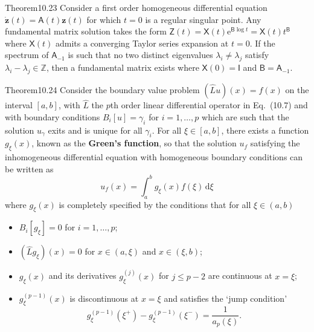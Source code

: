 \begin{res}{Theorem}{10.23}
Consider a first order homogeneous differential equation $\dot{\boldsymbol z}(t)=\mathsf A(t)\boldsymbol z(t)$ for which $t=0$ is a regular singular point. Any fundamental matrix solution takes the form $\mathsf Z(t)=\mathsf X(t)\mathrm e^{\mathsf B\log t}=\mathsf X(t)t^{\mathsf B}$ where $\mathsf X(t)$ admits a converging Taylor series expansion at $t=0$. If the spectrum of $\mathsf A_{-1}$ is such that no two distinct eigenvalues $\lambda_i\ne\lambda_j$ satisfy $\lambda_i-\lambda_j\in\mathbb Z$, then a fundamental matrix exists where $\mathsf X(0)=\mathsf I$ and $\mathsf B=\mathsf A_{-1}$.
\end{res}

\begin{res}{Theorem}{10.24}
Consider the boundary value problem $(\hat Lu)(x)=f(x)$ on the interval $[a,b]$, with $\hat L$ the $p$th order linear differential operator in Eq.~(10.7) and with boundary conditions $B_i[u]=\gamma_i$ for $i=1,\dots,p$ which are such that the solution $u_\gamma$ exits and is unique for all $\gamma_i$. For all $\xi\in[a,b]$, there exists a function $g_\xi(x)$, known as the \textbf{Green's function}, so that the solution $u_f$ satisfying the inhomogeneous differential equation with homogeneous boundary conditions can be written as
\begin{equation}u_f(x)=\int_a^bg_\xi(x)f(\xi)\,\mathrm d\xi\tag{10.113}\end{equation}
where $g_\xi(x)$ is completely specified by the conditions that for all $\xi\in(a,b)$
\begin{itemize}
\item $B_i[g_\xi]=0$ for $i=1,\dots,p$;
\item $(\hat Lg_\xi)(x)=0$ for $x\in(a,\xi)$ and $x\in(\xi,b)$;
\item $g_\xi(x)$ and its derivatives $g_\xi^{(j)}(x)$ for $j\le p-2$ are continuous at $x=\xi$;
\item $g_\xi^{(p-1)}(x)$ is discontinuous at $x=\xi$ and satisfies the `jump condition'
\begin{equation}g_\xi^{(p-1)}(\xi^+)-g_\xi^{(p-1)}(\xi^-)=\frac1{a_p(\xi)}.\tag{10.114}\end{equation}
\end{itemize}
\end{res}

